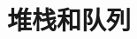 \documentclass[a4paper]{ctexart}
\theoremstyle{definition}
\theoremstyle{definition}
\begin{document}







\section{堆栈和队列}
\end{document}
